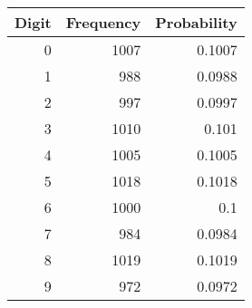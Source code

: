 
    \begin{tabular}{|r|r|r|}
    \toprule
    \hline
    \multicolumn{1}{|c|}{\textbf{Digit}} & \multicolumn{1}{c|}{\textbf{Frequency}} & \multicolumn{1}{c|}{\textbf{Probability}} \\
    \midrule
    \hline
    0     & 1007  & 0.1007 \\
    1     & 988   & 0.0988 \\
    2     & 997   & 0.0997 \\
    3     & 1010  & 0.101 \\
    4     & 1005  & 0.1005 \\
    5     & 1018  & 0.1018 \\
    6     & 1000  & 0.1 \\
    7     & 984   & 0.0984 \\
    8     & 1019  & 0.1019 \\
    9     & 972   & 0.0972 \\
    \hline
    \end{tabular}%
